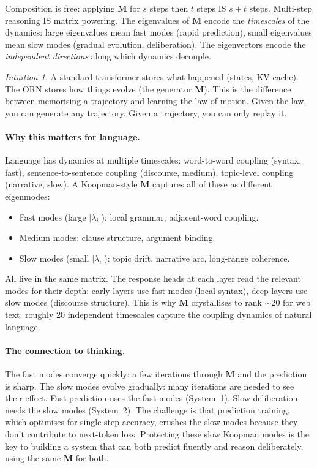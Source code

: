 \documentclass[11pt, a4paper]{article}
\newcommand{\M}{\mathbf{M}}
\theoremstyle{remark}
\newtheorem*{intuition}{Intuition}
\begin{document}
Composition is free: applying $\M$ for $s$ steps then $t$ steps IS $s{+}t$ steps.
Multi-step reasoning IS matrix powering.
The eigenvalues of $\M$ encode the \emph{timescales} of the dynamics: large eigenvalues mean fast modes (rapid prediction), small eigenvalues mean slow modes (gradual evolution, deliberation).
The eigenvectors encode the \emph{independent directions} along which dynamics decouple.

\begin{intuition}
A standard transformer stores what happened (states, KV cache).
The ORN stores how things evolve (the generator $\M$).
This is the difference between memorising a trajectory and learning the law of motion.
Given the law, you can generate any trajectory.
Given a trajectory, you can only replay it.
\end{intuition}

\paragraph{Why this matters for language.}
Language has dynamics at multiple timescales: word-to-word coupling (syntax, fast), sentence-to-sentence coupling (discourse, medium), topic-level coupling (narrative, slow).
A Koopman-style $\M$ captures all of these as different eigenmodes:
\begin{itemize}[nosep]
    \item Fast modes (large $|\lambda_i|$): local grammar, adjacent-word coupling.
    \item Medium modes: clause structure, argument binding.
    \item Slow modes (small $|\lambda_i|$): topic drift, narrative arc, long-range coherence.
\end{itemize}
All live in the same matrix.
The response heads at each layer read the relevant modes for their depth: early layers use fast modes (local syntax), deep layers use slow modes (discourse structure).
This is why $\M$ crystallises to rank ${\sim}20$ for web text: roughly 20 independent timescales capture the coupling dynamics of natural language.

\paragraph{The connection to thinking.}
The fast modes converge quickly: a few iterations through $\M$ and the prediction is sharp.
The slow modes evolve gradually: many iterations are needed to see their effect.
Fast prediction uses the fast modes (System~1).
Slow deliberation needs the slow modes (System~2).
The challenge is that prediction training, which optimises for single-step accuracy, crushes the slow modes because they don't contribute to next-token loss.
Protecting these slow Koopman modes is the key to building a system that can both predict fluently and reason deliberately, using the same $\M$ for both.
\end{document}
